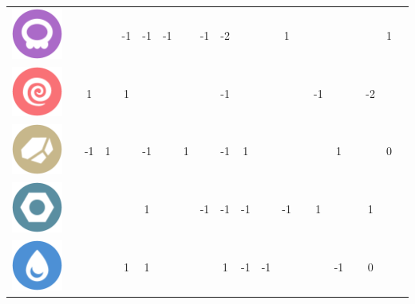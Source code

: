 \begin{table}[h]
\begin{tabular}{c c c c c c c c c c c c c c c c c c c c}
    \includegraphics[scale=.1]{images/poison.png} & & & & -1 & -1 & -1 & & -1 & -2 & & & 1 & & & & & & 1 \\
    \includegraphics[scale=.1]{images/psychic.png} & & 1 & & 1 & & & & & -1 & & & & & -1 & & & -2 & &  \\
    \includegraphics[scale=.1]{images/rock.png} & & -1 & 1 & & -1 & & 1 & & -1 & 1 & & & & & 1 & & & 0 \\
    \includegraphics[scale=.1]{images/steel.png} & & & & & 1 & & & -1 & -1 & -1 & & -1 & & 1 & & & 1 \\
    \includegraphics[scale=.1]{images/water.png} & & & & 1 & 1 & & & & 1 & -1 & -1 & & & & -1 & & 0 \\
\end{tabular}
\end{table}

